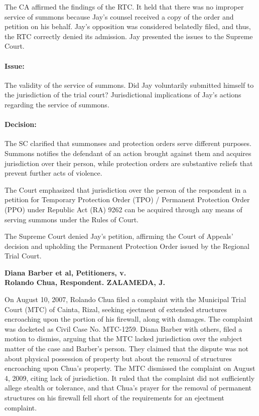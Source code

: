 \documentclass[
12pt,
oneside,
onehalfspacing,
headsepline
]{DigestCollection}
\begin{document}
The CA affirmed the findings of the RTC. It held that there was no improper service of summons because Jay's counsel received a copy of the order and petition on his behalf. Jay's opposition was considered belatedly filed, and thus, the RTC correctly denied its admission. Jay presented the issues to the Supreme Court.

\paragraph{Issue:}
\label{8704cf70-09fd-11ef-932c-63c852f65e48}


The validity of the service of summons. Did Jay voluntarily submitted himself to the jurisdiction of the trial court? Jurisdictional implications of Jay's actions regarding the service of summons.

\paragraph{Decision:}
\label{88706d60-09fd-11ef-932c-63c852f65e48}


The SC clarified that summonses and protection orders serve different purposes. Summons notifies the defendant of an action brought against them and acquires jurisdiction over their person, while protection orders are substantive reliefs that prevent further acts of violence.

The Court emphasized that jurisdiction over the person of the respondent in a petition for Temporary Protection Order (TPO) / Permanent Protection Order (PPO) under Republic Act (RA) 9262 can be acquired through any means of serving summons under the Rules of Court.

The Supreme Court denied Jay's petition, affirming the Court of Appeals' decision and upholding the Permanent Protection Order issued by the Regional Trial Court.

\label{c7908860-0a0f-11ef-932c-63c852f65e48}


\noindent\textbf{Diana Barber et al, Petitioners, v. \\Rolando Chua, Respondent. ZALAMEDA, J.}\vspace{0.4cm}

On August 10, 2007, Rolando Chua filed a complaint with the Municipal Trial Court (MTC) of Cainta, Rizal, seeking ejectment of extended structures encroaching upon the portion of his firewall, along with damages. The complaint was docketed as Civil Case No. MTC-1259. Diana Barber with others, filed a motion to dismiss, arguing that the MTC lacked jurisdiction over the subject matter of the case and Barber's person. They claimed that the dispute was not about physical possession of property but about the removal of structures encroaching upon Chua's property. The MTC dismissed the complaint on August 4, 2009, citing lack of jurisdiction. It ruled that the complaint did not sufficiently allege stealth or tolerance, and that Chua's prayer for the removal of permanent structures on his firewall fell short of the requirements for an ejectment complaint.
\end{document}
